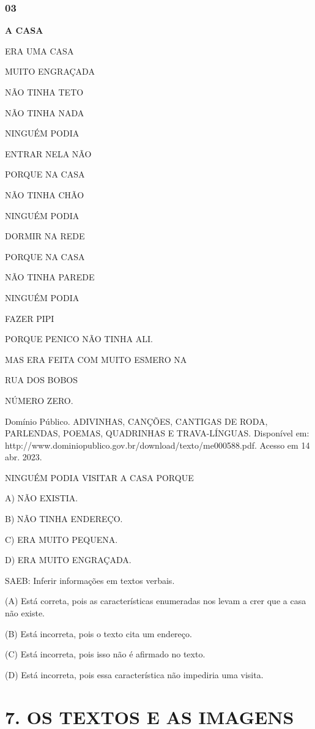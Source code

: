 \subsubsection{03}\label{section-22}

\textbf{A CASA}

ERA UMA CASA

MUITO ENGRAÇADA

NÃO TINHA TETO

NÃO TINHA NADA

NINGUÉM PODIA

ENTRAR NELA NÃO

PORQUE NA CASA

NÃO TINHA CHÃO

NINGUÉM PODIA

DORMIR NA REDE

PORQUE NA CASA

NÃO TINHA PAREDE

NINGUÉM PODIA

FAZER PIPI

PORQUE PENICO NÃO TINHA ALI.

MAS ERA FEITA COM MUITO ESMERO NA

RUA DOS BOBOS

NÚMERO ZERO.

Domínio Público. ADIVINHAS, CANÇÕES, CANTIGAS DE RODA, PARLENDAS, POEMAS, QUADRINHAS E TRAVA-LÍNGUAS. Disponível em: http://www.dominiopublico.gov.br/download/texto/me000588.pdf. Acesso em 14 abr. 2023.

NINGUÉM PODIA VISITAR A CASA PORQUE

A) NÃO EXISTIA.

B) NÃO TINHA ENDEREÇO.

C) ERA MUITO PEQUENA.

D) ERA MUITO ENGRAÇADA.

\protect\hypertarget{_heading=h.2p2csry}{}{}SAEB: Inferir
informações em textos verbais.

(A) Está correta, pois as características enumeradas nos levam a crer que a casa não existe.

(B) Está incorreta, pois o texto cita um endereço.

(C) Está incorreta, pois isso não é afirmado no texto.

(D) Está incorreta, pois essa característica não impediria uma visita.

\section{7. OS TEXTOS E AS
IMAGENS}\label{muxf3dulo-7-os-textos-e-as-imagens}

